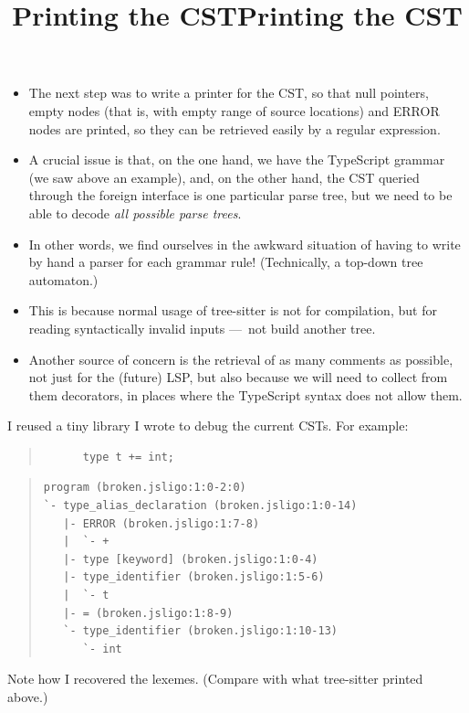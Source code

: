 \documentclass[wide]{slides}
\newcommand{\TypeScript}[0]{\textsf{TypeScript}}
\newcommand{\TreeSitter}[0]{\textsf{tree-sitter}}
\begin{document}
\begin{slide}
  \title{Printing the CST}

  \begin{itemize}

    \item The next step was to write a printer for the CST, so that
      null pointers, empty nodes (that is, with empty range of source
      locations) and ERROR nodes are printed, so they can be retrieved
      easily by a regular expression.

    \item A crucial issue is that, on the one hand, we have the
      \TypeScript{} grammar (we saw above an example), and, on the
      other hand, the CST queried through the foreign interface is one
      particular parse tree, but we need to be able to decode
      \emph{all possible parse trees}.

    \item In other words, we find ourselves in the awkward situation
      of having to write by hand a parser for each grammar rule!
      (Technically, a top\hyp{}down tree automaton.)

    \item This is because normal usage of \TreeSitter{} is not for
      compilation, but for reading syntactically invalid inputs
      ---~not build another tree.

    \item Another source of concern is the retrieval of as many
      comments as possible, not just for the (future) LSP, but also
      because we will need to collect from them decorators, in places
      where the \TypeScript{} syntax does not allow them.

  \end{itemize}

\end{slide}

\begin{slide}
  \title{Printing the CST}

  I reused a tiny library I wrote to debug the current CSTs. For example:
  \begin{quote}
    \begin{lstlisting}
      type t += int;
    \end{lstlisting}
  \end{quote}

  \begin{quote}
  \begin{verbatim}
program (broken.jsligo:1:0-2:0)
`- type_alias_declaration (broken.jsligo:1:0-14)
   |- ERROR (broken.jsligo:1:7-8)
   |  `- +
   |- type [keyword] (broken.jsligo:1:0-4)
   |- type_identifier (broken.jsligo:1:5-6)
   |  `- t
   |- = (broken.jsligo:1:8-9)
   `- type_identifier (broken.jsligo:1:10-13)
      `- int
  \end{verbatim}
  \end{quote}

  Note how I recovered the lexemes. (Compare with what \TreeSitter{}
  printed above.)

\end{slide}
\end{document}
